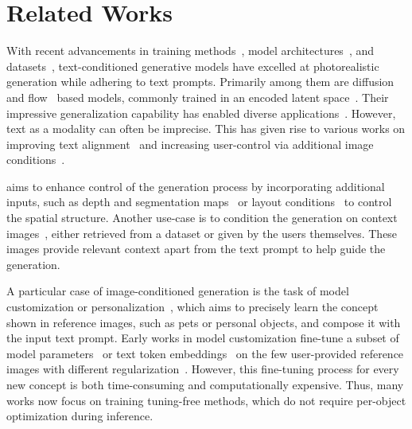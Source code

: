 \section{Related Works}
With recent advancements in training methods~\cite{ho2020denoising,dhariwal2021diffusion,sauer2023stylegan,karras2022elucidating,karras2023analyzing,liu2022flow,yu2022scaling}, model architectures~\cite{peebles2023scalable,rombach2022high,esser2024scaling,ramesh2022hierarchical,kang2023scaling}, and datasets~\cite{schuhmann2021laion}, text-conditioned generative models have excelled at photorealistic generation while adhering to text prompts. Primarily among them are diffusion~\cite{lu2022dpm,rombach2022high} and flow~\cite{esser2024scaling,flux} based models, commonly trained in an encoded latent space~\cite{rombach2022high,esser2021taming}.  
Their impressive generalization capability has enabled diverse  applications~\cite{parmar2023zero,richardson2023conceptlab,hertz2022prompt,mokady2023null,meng2021sdedit,hertz2024style,huang2024creativesynth,gu2024swapanything,ge2023expressive}. However, text as a modality can often be imprecise. This has given rise to various works on improving text alignment~\cite{chefer2023attend,ge2023expressive,liu2022compositional} and increasing user-control via additional image conditions~\cite{zhang2023adding,chen2022re}. 


%
aims to enhance control of the generation process by incorporating additional inputs, such as depth and segmentation maps~\cite{zhao2024uni,zhang2023adding,avrahami2023spatext,densediffusion} or layout conditions~\cite{li2023gligen,phung2023grounded,Zheng_2023_CVPR,bhat2024loosecontrol} to control the spatial structure. 
Another use-case is to condition the generation on context images~\cite{chen2022re,najdenkoska2024context}, either retrieved from a dataset or given by the users themselves. These images provide relevant context apart from the text prompt to help guide the generation. 



 A particular case of image-conditioned generation is the task of model customization or personalization~\cite{ruiz2022dreambooth,gal2022image,kumari2023multi}, which aims to precisely learn the concept shown in reference images, such as pets or personal objects, and compose it with the input text prompt. 
Early works in model customization fine-tune a subset of model parameters~\cite{kumari2023multi,han2023svdiff,hu2021lora,tewel2023key} or text token embeddings~\cite{gal2022image,voynov2023p+,zhang2023prospect,alaluf2023neural} on the few user-provided reference images with different regularization~\cite{ruiz2022dreambooth,kumari2023multi}. However, this fine-tuning process for every new concept is both time-consuming and computationally expensive. 
Thus, many works now focus on training tuning-free methods, which do not require per-object optimization during inference.  


